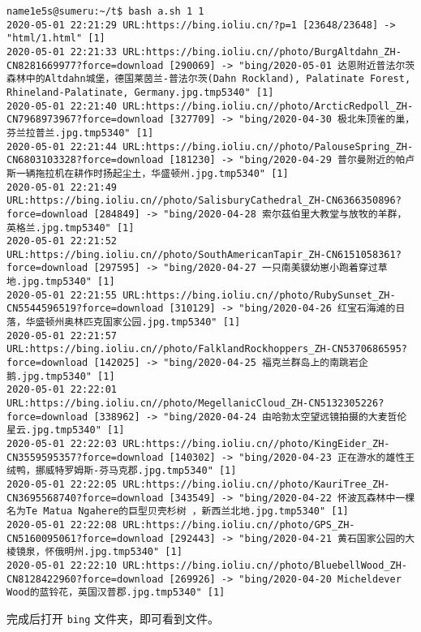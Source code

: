 \documentclass[blue,normal,cn]{elegantnote}
\newcommand{\code}[1]{\colorbox{light-gray}{\texttt{#1}}}
\begin{document}
\begin{lstlisting}
name1e5s@sumeru:~/t$ bash a.sh 1 1
2020-05-01 22:21:29 URL:https://bing.ioliu.cn/?p=1 [23648/23648] -> "html/1.html" [1]
2020-05-01 22:21:33 URL:https://bing.ioliu.cn//photo/BurgAltdahn_ZH-CN8281669977?force=download [290069] -> "bing/2020-05-01 达恩附近普法尔茨森林中的Altdahn城堡，德国莱茵兰-普法尔茨(Dahn Rockland), Palatinate Forest, Rhineland-Palatinate, Germany.jpg.tmp5340" [1]
2020-05-01 22:21:40 URL:https://bing.ioliu.cn//photo/ArcticRedpoll_ZH-CN7968973967?force=download [327709] -> "bing/2020-04-30 极北朱顶雀的巢，芬兰拉普兰.jpg.tmp5340" [1]
2020-05-01 22:21:44 URL:https://bing.ioliu.cn//photo/PalouseSpring_ZH-CN6803103328?force=download [181230] -> "bing/2020-04-29 普尔曼附近的帕卢斯一辆拖拉机在耕作时扬起尘土，华盛顿州.jpg.tmp5340" [1]
2020-05-01 22:21:49 URL:https://bing.ioliu.cn//photo/SalisburyCathedral_ZH-CN6366350896?force=download [284849] -> "bing/2020-04-28 索尔茲伯里大教堂与放牧的羊群，英格兰.jpg.tmp5340" [1]
2020-05-01 22:21:52 URL:https://bing.ioliu.cn//photo/SouthAmericanTapir_ZH-CN6151058361?force=download [297595] -> "bing/2020-04-27 一只南美貘幼崽小跑着穿过草地.jpg.tmp5340" [1]
2020-05-01 22:21:55 URL:https://bing.ioliu.cn//photo/RubySunset_ZH-CN5544596519?force=download [310129] -> "bing/2020-04-26 红宝石海滩的日落，华盛顿州奥林匹克国家公园.jpg.tmp5340" [1]
2020-05-01 22:21:57 URL:https://bing.ioliu.cn//photo/FalklandRockhoppers_ZH-CN5370686595?force=download [142025] -> "bing/2020-04-25 福克兰群岛上的南跳岩企鹅.jpg.tmp5340" [1]
2020-05-01 22:22:01 URL:https://bing.ioliu.cn//photo/MegellanicCloud_ZH-CN5132305226?force=download [338962] -> "bing/2020-04-24 由哈勃太空望远镜拍摄的大麦哲伦星云.jpg.tmp5340" [1]
2020-05-01 22:22:03 URL:https://bing.ioliu.cn//photo/KingEider_ZH-CN3559595357?force=download [140302] -> "bing/2020-04-23 正在游水的雄性王绒鸭，挪威特罗姆斯-芬马克郡.jpg.tmp5340" [1]
2020-05-01 22:22:05 URL:https://bing.ioliu.cn//photo/KauriTree_ZH-CN3695568740?force=download [343549] -> "bing/2020-04-22 怀波瓦森林中一棵名为Te Matua Ngahere的巨型贝壳杉树 ，新西兰北地.jpg.tmp5340" [1]
2020-05-01 22:22:08 URL:https://bing.ioliu.cn//photo/GPS_ZH-CN5160095061?force=download [292443] -> "bing/2020-04-21 黄石国家公园的大棱镜泉，怀俄明州.jpg.tmp5340" [1]
2020-05-01 22:22:10 URL:https://bing.ioliu.cn//photo/BluebellWood_ZH-CN8128422960?force=download [269926] -> "bing/2020-04-20 Micheldever Wood的蓝铃花，英国汉普郡.jpg.tmp5340" [1]
\end{lstlisting}

完成后打开 \code{bing} 文件夹，即可看到文件。
\end{document}
